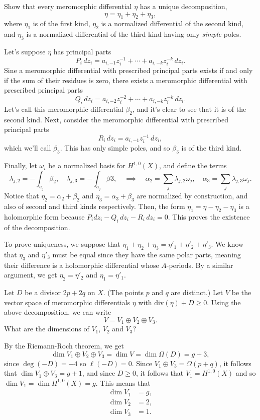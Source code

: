 \documentclass[expanded]{lkx_pset}
\begin{document}
\begin{parts}
	\begin{part}{}
		Show that every meromorphic differential $\eta$ has a unique
		decomposition,
		\[
			\eta = \eta_1 + \eta_2 +\eta_3,
		\]
		where $\eta_1$ is of the first kind, $\eta_2$ is a normalized
		differential of the second kind, and $\eta_3$ is a normalized
		differential of the third kind having only \emph{simple} poles.
	\end{part}

	Let's suppose $\eta$ has principal parts
	\[
		P_i\,dz_i = a_{i,-1} z_i^{-1} + \cdots + a_{i,-k}z_i^{-k}\,dz_i.
	\]
	Sine a meromorphic differential with prescribed principal parts exists if and only if the sum of their residues is zero, there exists a meromorphic differential with prescribed principal parts \[Q_i \,dz_i = a_{i,-2}z_i^{-2}+\cdots + a_{i,-k}z_i^{-k}\,dz_i.\] Let's call this meromorphic differential $\beta_2$, and it's clear to see that it is of the second kind. Next, consider the meromorphic differential with prescribed principal parts \[R_i\,dz_i = a_{i,-1}z_i^{-1}\,dz_i,\] which we'll call $\beta_3$. This has only simple poles, and so $\beta_3$ is of the third kind.

	Finally, let $\omega_i$ be a normalized basis for $H^{1,0}(X)$, and define the terms
	\[
		\lambda_{j,2} = -\int_{a_j} \beta_2, \quad \lambda_{j,3} = -\int_{a_j}\beta3,\quad\implies\quad \alpha_2 = \sum_j \lambda_{j,2}\omega_j,\quad\alpha_3=\sum_j\lambda_{j,3}\omega_j.
	\]
	Notice that $\eta_2 = \alpha_2 + \beta_2$ and $\eta_3 = \alpha_3 + \beta_3$ are normalized by construction, and also of second and third kinds respectively. Then, the form $\eta_1 = \eta - \eta_2 - \eta_3$ is a holomorphic form because $P_i dz_i - Q_i\,dz_i - R_i\,dz_i=0$. This proves the existence of the decomposition.

	To prove uniqueness, we suppose that $\eta_1+\eta_2+\eta_3 = \eta'_1 + \eta'_2 + \eta'_3$. We know that $\eta_3$ and $\eta'_3$ must be equal since they have the same polar parts, meaning their difference is a holomorphic differential whose $A$-periods. By a similar argument, we get $\eta_2=\eta'_2$ and $\eta_1=\eta'_1$.

	\begin{part}{}
		Let $D$ be a divisor $2p + 2q$ on $X$. (The points
		$p$ and $q$ are distinct.) Let $V$ be
		the vector space of meromorphic differentials $\eta$ with
		$\mathrm{div}(\eta) + D \ge 0$.  Using the above decomposition, we
		can write
		\[
			V = V_1 \oplus V_2 \oplus V_3.
		\]
		What are the dimensions of $V_1$, $V_2$ and $V_3$?
	\end{part}

	By the Riemann-Roch theorem, we get
	\[
		\dim V_1 \oplus V_2\oplus V_3 = \dim V = \dim \Omega(D) = g+3,
	\]
	since $\deg(-D)=-4$ so $\ell(-D)=0$. Since $V_1\oplus V_3=\Omega(p+q)$, it follows that $\dim V_1 \oplus V_3 = g+1$, and since $D\geq 0$, it follows that $V_1=H^{1,0}(X)$ and so $\dim V_1 = \dim H^{1,0}(X)=g$. This means that
	\[
		\begin{aligned}
			\dim V_1 & = g, \\
			\dim V_2 & =2,  \\
			\dim V_3 & = 1.
		\end{aligned}
	\]
\end{parts}
\end{document}
